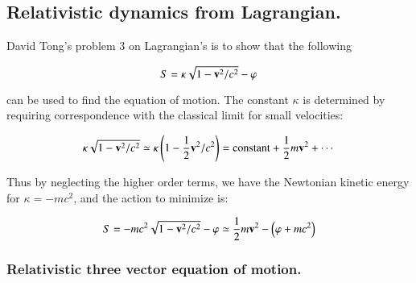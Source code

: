 
%
%
%

\chapter{} %



\section{Relativistic dynamics from Lagrangian. }

David Tong's problem 3 on Lagrangian's is to show that the following

\begin{equation}
S = \kappa \sqrt{1 - \mathbf{v}^2/c^2} - \varphi
\end{equation}

can be used to find the equation of motion.  The constant $\kappa$ is determined
by requiring correspondence with the classical limit for small velocities:

\begin{equation*}
\kappa \sqrt{1 - \mathbf{v}^2/c^2} \simeq \kappa \left( 1 - \frac{1}{2} \mathbf{v}^2/c^2 \right) = \text{constant} + \frac{1}{2} m \mathbf{v}^2 + \cdots
\end{equation*}

Thus by neglecting the higher order terms, we have the Newtonian kinetic energy for $\kappa = -mc^2$, and the action to minimize is:

\begin{equation}
S = -m c^2\sqrt{1 - \mathbf{v}^2/c^2} - \varphi \simeq \frac{1}{2}m \mathbf{v}^2 - \left(\varphi + m c^2\right)
\end{equation}

\subsection{Relativistic three vector equation of motion. }

